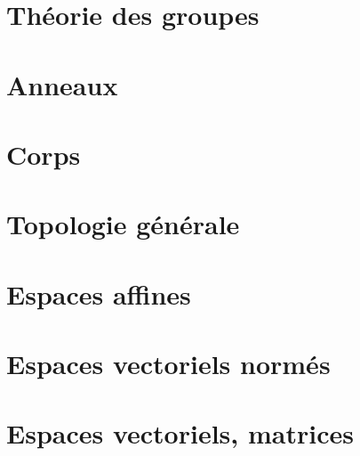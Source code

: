 






    

\chapter{Théorie des groupes}



\chapter{Anneaux}


\chapter{Corps}





\chapter{Topologie générale}



\chapter{Espaces affines}


\chapter{Espaces vectoriels normés}



\chapter{Espaces vectoriels, matrices}






